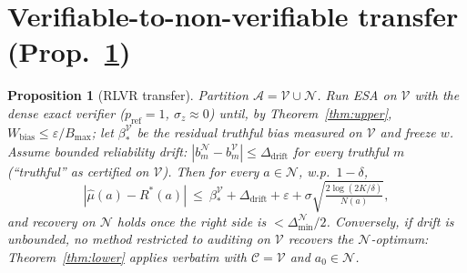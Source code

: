 \documentclass[11pt]{article}
\newtheorem{proposition}{Proposition}
\theoremstyle{definition}\newtheorem{definition}{Definition}
\theoremstyle{definition}\newtheorem{assumption}{Assumption}
\newcommand{\Rstar}{R^{\ast}}\newcommand{\astar}{a^{\ast}}
\newcommand{\A}{\mathcal{A}}\newcommand{\Cov}{\mathcal{C}}
\newcommand{\V}{\mathcal{V}}\newcommand{\N}{\mathcal{N}}
\begin{document}
\section{Verifiable-to-non-verifiable transfer (Prop.\ \texorpdfstring{\ref*{prop:rlvr}}{7})}
\label{app:rlvr}

\begin{proposition}[RLVR transfer]\label{prop:rlvr}
Partition $\A=\V\cup\N$. Run ESA on $\V$ with the dense exact verifier
($p_{\mathrm{ref}}=1$, $\sigma_z\approx0$) until, by Theorem~\ref{thm:upper},
$W_{\mathrm{bias}}\le\varepsilon/B_{\max}$; let $\beta_\ast^{\V}$ be the residual
truthful bias measured on $\V$ and freeze $w$. Assume bounded reliability drift:
$|b_m^{\N}-b_m^{\V}|\le\Delta_{\mathrm{drift}}$ for every truthful $m$
(``truthful'' as certified on $\V$). Then for every $a\in\N$, w.p.\ $1-\delta$,
\[
|\hat\mu(a)-\Rstar(a)|\ \le\ \beta_\ast^{\V}+\Delta_{\mathrm{drift}}
+\varepsilon+\sigma\sqrt{\tfrac{2\log(2K/\delta)}{N(a)}},
\]
and recovery on $\N$ holds once the right side is $<\Delta_{\min}^{\N}/2$.
Conversely, if drift is unbounded, no method restricted to auditing on $\V$
recovers the $\N$-optimum: Theorem~\ref{thm:lower} applies verbatim with
$\Cov=\V$ and $a_0\in\N$.
\end{proposition}
\end{document}
